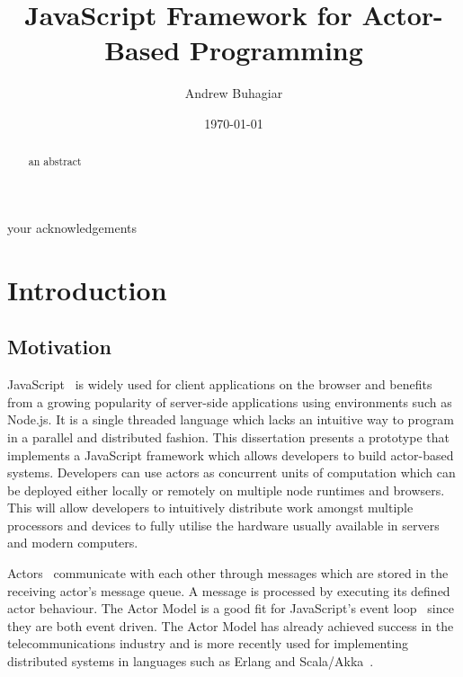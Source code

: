 \documentclass[12pt, a4paper]{report}
\theoremstyle{definition}
\theoremstyle{definition}%
\theoremstyle{definition}%
\theoremstyle{definition}%
\theoremstyle{definition}%
\theoremstyle{definition}%
\begin{document}
\title{JavaScript Framework for Actor-Based Programming}
\author{Andrew Buhagiar}
\date{\today}

\frontmatter


\begin{acknowledgements}
your acknowledgements
\end{acknowledgements}
       
\begin{abstract}
an abstract
\end{abstract}

\tableofcontents

\listoffigures

\listoftables



\mainmatter

\chapter{Introduction}
\section{Motivation}
JavaScript~\cite{ecmascript} is widely used for client applications on the browser and benefits from a growing popularity of server-side applications using environments such as Node.js. It is a single threaded language which lacks an intuitive way to program in a parallel and distributed fashion. This dissertation presents a prototype that implements a JavaScript framework which allows developers to build actor-based systems. Developers can use actors as concurrent units of computation which can be deployed either locally or remotely on multiple node runtimes and browsers. This will allow developers to intuitively distribute work amongst multiple processors and devices to fully utilise the hardware usually available in servers and modern computers.

Actors~\cite{hewitt1973session}\cite{43years} communicate with each other through messages which are stored in the receiving actor's message queue. A message is processed by executing its defined actor behaviour. The Actor Model is a good fit for JavaScript's event loop~\cite{eventloopbrowser}\cite{eventloopnode} since they are both event driven. The Actor Model has already achieved success in the telecommunications industry and is more recently used for implementing distributed systems in languages such as Erlang and Scala/Akka~\cite{haller2012integration}.
\end{document}
